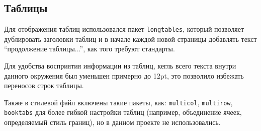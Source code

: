 \subsection{Таблицы}
\label{sec:tables}

Для отображения таблиц использовался пакет \texttt{longtables}, который позволяет дублировать заголовки таблиц и в начале каждой новой страницы добавлять текст ``продолжение таблицы...'', как того требуют стандарты.

Для удобства восприятия информации из таблиц, кегль всего текста внутри данного окружения был уменьшен примерно до 12pt, это позволило избежать переносов строк таблицы.

Также в стилевой файл включены такие пакеты, как: \texttt{multicol}, \texttt{multirow}, \texttt{booktabs} для более гибкой настройки таблиц (например, объединение ячеек, определяемый стиль границ), но в данном проекте не использовались.